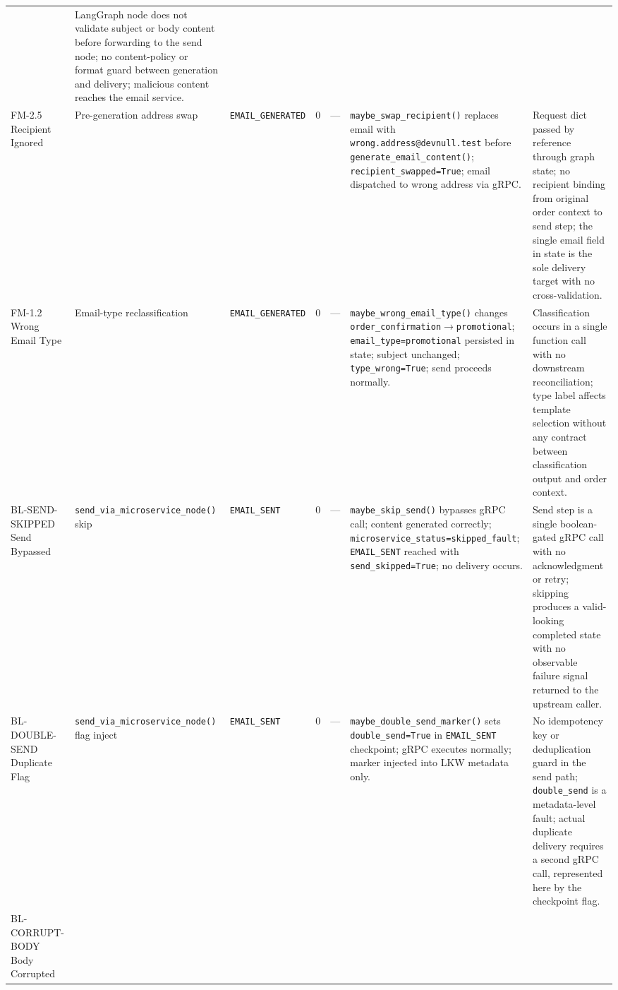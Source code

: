 \documentclass[conference]{IEEEtran}
\begin{document}
\begin{table}[!t]
\begin{tabularx}{\textwidth}{J{1.4cm}J{1.9cm}J{1.7cm}cJ{1.4cm}KK}
  & LangGraph node does not validate subject or body content before forwarding
    to the send node; no content-policy or format guard between generation and
    delivery; malicious content reaches the email service. \\
FM-2.5 Recipient Ignored
  & Pre-generation address swap
  & \texttt{EMAIL\_GENERATED}  & 0  & ---
  & \texttt{maybe\_swap\_recipient()} replaces email with
    \texttt{wrong.address@devnull.test} before
    \texttt{generate\_email\_content()}; \texttt{recipient\_swapped=True};
    email dispatched to wrong address via gRPC.
  & Request dict passed by reference through graph state; no recipient binding
    from original order context to send step; the single email field in state
    is the sole delivery target with no cross-validation. \\
FM-1.2 Wrong Email Type
  & Email-type reclassification
  & \texttt{EMAIL\_GENERATED}  & 0  & ---
  & \texttt{maybe\_wrong\_email\_type()} changes
    \texttt{order\_confirmation}$\to$\texttt{promotional};
    \texttt{email\_type=promotional} persisted in state; subject unchanged;
    \texttt{type\_wrong=True}; send proceeds normally.
  & Classification occurs in a single function call with no downstream
    reconciliation; type label affects template selection without any contract
    between classification output and order context. \\
BL-SEND-SKIPPED Send Bypassed
  & \texttt{send\_via\_microservice\_node()} skip
  & \texttt{EMAIL\_SENT}  & 0  & ---
  & \texttt{maybe\_skip\_send()} bypasses gRPC call; content generated
    correctly; \texttt{microservice\_status=skipped\_fault};
    \texttt{EMAIL\_SENT} reached with \texttt{send\_skipped=True}; no delivery
    occurs.
  & Send step is a single boolean-gated gRPC call with no acknowledgment or
    retry; skipping produces a valid-looking completed state with no observable
    failure signal returned to the upstream caller. \\
BL-DOUBLE-SEND Duplicate Flag
  & \texttt{send\_via\_microservice\_node()} flag inject
  & \texttt{EMAIL\_SENT}  & 0  & ---
  & \texttt{maybe\_double\_send\_marker()} sets \texttt{double\_send=True} in
    \texttt{EMAIL\_SENT} checkpoint; gRPC executes normally; marker injected
    into LKW metadata only.
  & No idempotency key or deduplication guard in the send path;
    \texttt{double\_send} is a metadata-level fault; actual duplicate delivery
    requires a second gRPC call, represented here by the checkpoint flag. \\
BL-CORRUPT-BODY Body Corrupted

\end{tabularx}
\end{table}
\end{document}
